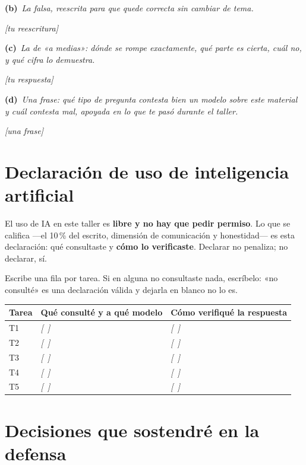 \documentclass[11pt,a4paper,oneside]{article}
\newcommand{\marcador}[1]{\textcolor{grismarcador}{\textit{[#1]}}}
\newcommand{\literal}[2]{\vspace{0.35\baselineskip}\noindent\textbf{(#1)}~\textit{#2}\par}
\begin{document}
\literal{b}{La falsa, reescrita para que quede correcta sin cambiar de tema.}
\marcador{tu reescritura}

\literal{c}{La de «a medias»: dónde se rompe exactamente, qué parte es cierta, cuál no, y qué cifra lo demuestra.}
\marcador{tu respuesta}

\literal{d}{Una frase: qué tipo de pregunta contesta bien un modelo sobre este material y cuál contesta mal, apoyada en lo que te pasó durante el taller.}
\marcador{una frase}

\newpage
\section{Declaración de uso de inteligencia artificial}

El uso de IA en este taller es \textbf{libre y no hay que pedir permiso}. Lo que se califica —el
10\,\% del escrito, dimensión de comunicación y honestidad— es esta declaración: qué consultaste y
\textbf{cómo lo verificaste}. Declarar no penaliza; no declarar, sí.

Escribe una fila por tarea. Si en alguna no consultaste nada, escríbelo: «no consulté» es una
declaración válida y dejarla en blanco no lo es.

\vspace{0.3cm}
\renewcommand{\arraystretch}{1.4}
\begingroup\setlength{\parskip}{0pt}
\begin{tabularx}{\textwidth}{@{}l X X@{}}
\toprule
\textbf{Tarea} & \textbf{Qué consulté y a qué modelo} & \textbf{Cómo verifiqué la respuesta} \\
\midrule
T1 & \marcador{~} & \marcador{~} \\
T2 & \marcador{~} & \marcador{~} \\
T3 & \marcador{~} & \marcador{~} \\
T4 & \marcador{~} & \marcador{~} \\
T5 & \marcador{~} & \marcador{~} \\
\bottomrule
\end{tabularx}
\endgroup

\section{Decisiones que sostendré en la defensa}
\end{document}
